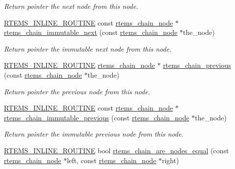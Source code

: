 \begin{DoxyCompactItemize}
\begin{DoxyCompactList}\small\item\em Return pointer the next node from this node. \end{DoxyCompactList}\item 
\mbox{\hyperlink{group__RTEMSScoreBaseDefs_gac216239df231d5dbd15e3520b0b9313f}{R\+T\+E\+M\+S\+\_\+\+I\+N\+L\+I\+N\+E\+\_\+\+R\+O\+U\+T\+I\+NE}} const \mbox{\hyperlink{structChain__Node__struct}{rtems\+\_\+chain\+\_\+node}} $\ast$ \mbox{\hyperlink{group__ClassicChains_gae90a97d8e1bc8e47669706ebf5c5dbf9}{rtems\+\_\+chain\+\_\+immutable\+\_\+next}} (const \mbox{\hyperlink{structChain__Node__struct}{rtems\+\_\+chain\+\_\+node}} $\ast$the\+\_\+node)
\begin{DoxyCompactList}\small\item\em Return pointer the immutable next node from this node. \end{DoxyCompactList}\item 
\mbox{\hyperlink{group__RTEMSScoreBaseDefs_gac216239df231d5dbd15e3520b0b9313f}{R\+T\+E\+M\+S\+\_\+\+I\+N\+L\+I\+N\+E\+\_\+\+R\+O\+U\+T\+I\+NE}} \mbox{\hyperlink{structChain__Node__struct}{rtems\+\_\+chain\+\_\+node}} $\ast$ \mbox{\hyperlink{group__ClassicChains_gaafcbf989d0d2e360aadd0d304a0f30e3}{rtems\+\_\+chain\+\_\+previous}} (const \mbox{\hyperlink{structChain__Node__struct}{rtems\+\_\+chain\+\_\+node}} $\ast$the\+\_\+node)
\begin{DoxyCompactList}\small\item\em Return pointer the previous node from this node. \end{DoxyCompactList}\item 
\mbox{\hyperlink{group__RTEMSScoreBaseDefs_gac216239df231d5dbd15e3520b0b9313f}{R\+T\+E\+M\+S\+\_\+\+I\+N\+L\+I\+N\+E\+\_\+\+R\+O\+U\+T\+I\+NE}} const \mbox{\hyperlink{structChain__Node__struct}{rtems\+\_\+chain\+\_\+node}} $\ast$ \mbox{\hyperlink{group__ClassicChains_ga75c2d9901c833e2cf819065fd9a897cd}{rtems\+\_\+chain\+\_\+immutable\+\_\+previous}} (const \mbox{\hyperlink{structChain__Node__struct}{rtems\+\_\+chain\+\_\+node}} $\ast$the\+\_\+node)
\begin{DoxyCompactList}\small\item\em Return pointer the immutable previous node from this node. \end{DoxyCompactList}\item 
\mbox{\hyperlink{group__RTEMSScoreBaseDefs_gac216239df231d5dbd15e3520b0b9313f}{R\+T\+E\+M\+S\+\_\+\+I\+N\+L\+I\+N\+E\+\_\+\+R\+O\+U\+T\+I\+NE}} bool \mbox{\hyperlink{group__ClassicChains_ga88b832d869a367d3a12b61213593ed83}{rtems\+\_\+chain\+\_\+are\+\_\+nodes\+\_\+equal}} (const \mbox{\hyperlink{structChain__Node__struct}{rtems\+\_\+chain\+\_\+node}} $\ast$left, const \mbox{\hyperlink{structChain__Node__struct}{rtems\+\_\+chain\+\_\+node}} $\ast$right)

\end{DoxyCompactItemize}
